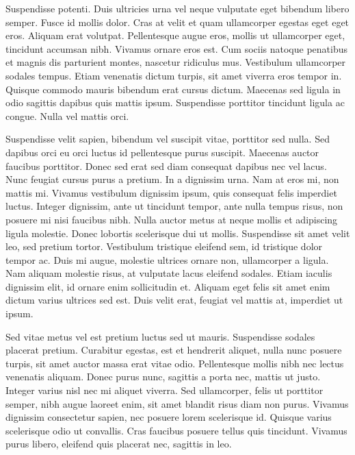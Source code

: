 Suspendisse potenti.
Duis ultricies urna vel neque vulputate eget bibendum libero semper.
Fusce id mollis dolor.
Cras at velit et quam ullamcorper egestas eget eget eros.
Aliquam erat volutpat.
Pellentesque augue eros, mollis ut ullamcorper eget, tincidunt accumsan nibh.
Vivamus ornare eros est.
Cum sociis natoque penatibus et magnis dis parturient montes, nascetur ridiculus mus.
Vestibulum ullamcorper sodales tempus.
Etiam venenatis dictum turpis, sit amet viverra eros tempor in.
Quisque commodo mauris bibendum erat cursus dictum.
Maecenas sed ligula in odio sagittis dapibus quis mattis ipsum.
Suspendisse porttitor tincidunt ligula ac congue.
Nulla vel mattis orci.

Suspendisse velit sapien, bibendum vel suscipit vitae, porttitor sed nulla.
Sed dapibus orci eu orci luctus id pellentesque purus suscipit.
Maecenas auctor faucibus porttitor.
Donec sed erat sed diam consequat dapibus nec vel lacus.
Nunc feugiat cursus purus a pretium.
In a dignissim urna.
Nam at eros mi, non mattis mi.
Vivamus vestibulum dignissim ipsum, quis consequat felis imperdiet luctus.
Integer dignissim, ante ut tincidunt tempor, ante nulla tempus risus, non posuere mi nisi faucibus nibh.
Nulla auctor metus at neque mollis et adipiscing ligula molestie.
Donec lobortis scelerisque dui ut mollis.
Suspendisse sit amet velit leo, sed pretium tortor.
Vestibulum tristique eleifend sem, id tristique dolor tempor ac.
Duis mi augue, molestie ultrices ornare non, ullamcorper a ligula.
Nam aliquam molestie risus, at vulputate lacus eleifend sodales.
Etiam iaculis dignissim elit, id ornare enim sollicitudin et.
Aliquam eget felis sit amet enim dictum varius ultrices sed est.
Duis velit erat, feugiat vel mattis at, imperdiet ut ipsum.

Sed vitae metus vel est pretium luctus sed ut mauris.
Suspendisse sodales placerat pretium.
Curabitur egestas, est et hendrerit aliquet, nulla nunc posuere turpis, sit amet auctor massa erat vitae odio.
Pellentesque mollis nibh nec lectus venenatis aliquam.
Donec purus nunc, sagittis a porta nec, mattis ut justo.
Integer varius nisl nec mi aliquet viverra.
Sed ullamcorper, felis ut porttitor semper, nibh augue laoreet enim, sit amet blandit risus diam non purus.
Vivamus dignissim consectetur sapien, nec posuere lorem scelerisque id.
Quisque varius scelerisque odio ut convallis.
Cras faucibus posuere tellus quis tincidunt.
Vivamus purus libero, eleifend quis placerat nec, sagittis in leo.


